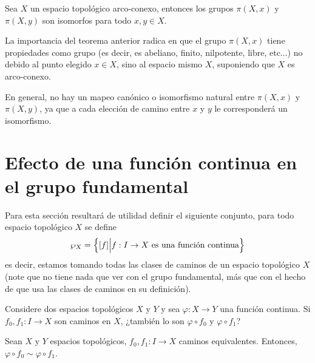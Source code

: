 \documentclass[12pt]{report}
\theoremstyle{largebreak}
\newcommand\cf[3]{\ensuremath{#1:#2\rightarrow#3}}
\begin{document}
    \begin{cor}
        Sea $X$ un espacio topológico arco-conexo, entonces los grupos $\pi(X,x)$ y $\pi(X,y)$ son isomorfos para todo $x,y\in X$.
    \end{cor}

    La importancia del teorema anterior radica en que el grupo $\pi(X,x)$ tiene propiedades como grupo (es decir, es abeliano, finito, nilpotente, libre, etc...) no debido al punto elegido $x\in X$, sino al espacio mismo $X$, suponiendo que $X$ es arco-conexo.

    En general, no hay un mapeo canónico o isomorfismo natural entre $\pi(X,x)$ y $\pi(X,y)$, ya que a cada elección de camino entre $x$ y $y$ le corresponderá un isomorfismo.

    \section{Efecto de una función continua en el grupo fundamental}

    \begin{obs}
        Para esta sección resultará de utilidad definir el siguiente conjunto, para todo espacio topológico $X$ se define
        \begin{equation*}
            \wp_X = \left\{[f]\Big|\cf{f}{I}{X}\textup{ es una función continua} \right\}
        \end{equation*}
        es decir, estamos tomando todas las clases de caminos de un espacio topológico $X$ (note que no tiene nada que ver con el grupo fundamental, más que con el hecho de que usa las clases de caminos en su definición).
    \end{obs}

    Considere dos espacios topológicos $X$ y $Y$ y sea $\cf{\varphi}{X}{Y}$ una función continua. Si $\cf{f_0,f_1}{I}{X}$ son caminos en $X$, ¿también lo son $\varphi\circ f_0$ y $\varphi\circ f_1$?

    \begin{propo}
        Sean $X$ y $Y$ espacios topológicos, $\cf{f_0,f_1}{I}{X}$ caminos equivalentes. Entonces, $\varphi\circ f_0\sim \varphi\circ f_1$.
    \end{propo}
\end{document}
